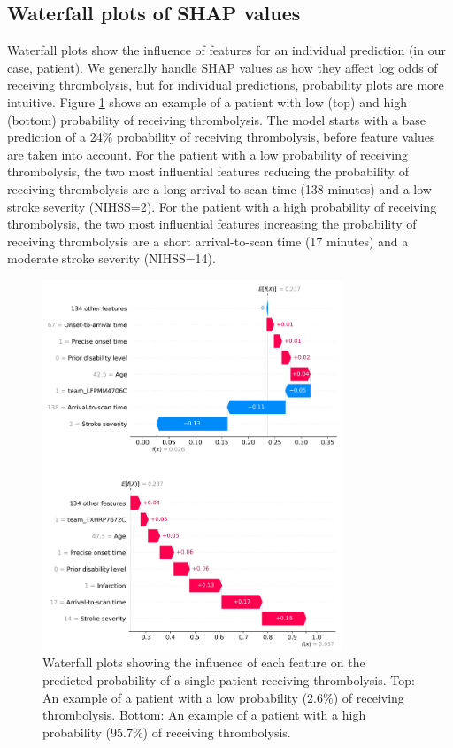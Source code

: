 
\subsection{Waterfall plots of SHAP values}
Waterfall plots show the influence of features for an individual prediction (in our case, patient). We generally handle SHAP values as how they affect log odds of receiving thrombolysis, but for individual predictions, probability plots are more intuitive. Figure \ref{fig:results_waterfall} shows an example of a patient with low (top) and high (bottom) probability of receiving thrombolysis. The model starts with a base prediction of a 24\% probability of receiving thrombolysis, before feature values are taken into account. For the patient with a low probability of receiving thrombolysis, the two most influential features reducing the probability of receiving thrombolysis are a long arrival-to-scan time (138 minutes) and a low stroke severity (NIHSS=2). For the patient with a high probability of receiving thrombolysis, the two most influential features increasing the probability of receiving thrombolysis are a short arrival-to-scan time (17 minutes) and a moderate stroke severity (NIHSS=14). 

\begin{figure}[!h]
\centering
\includegraphics[width=0.8\textwidth]{./images/waterfall}
\caption{Waterfall plots showing the influence of each feature on the predicted probability of a single patient receiving thrombolysis. Top: An example of a patient with a low probability (2.6\%) of receiving thrombolysis. Bottom: An example of a patient with a high probability (95.7\%) of receiving thrombolysis.}
\label{fig:results_waterfall}
\end{figure}


